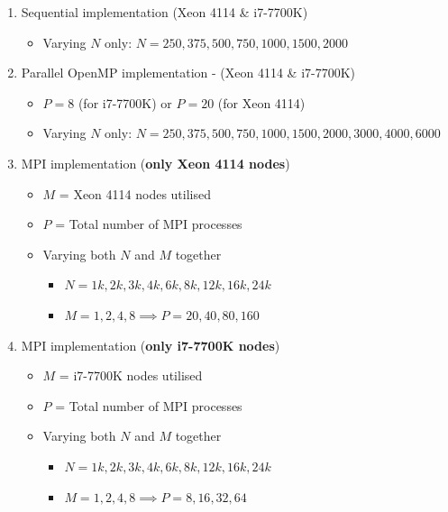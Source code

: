 \documentclass[12pt]{article}
\begin{document}
\begin{enumerate}
    \item Sequential implementation (Xeon 4114 \& i7-7700K)
	\begin{itemize}
		\item Varying $N$ only: $N = 250, 375, 500, 750, 1000, 1500, 2000$
	\end{itemize}
	
	\item Parallel OpenMP implementation - (Xeon 4114 \& i7-7700K)
	\begin{itemize}
	    \item $P = 8$ (for i7-7700K) or $P = 20$ (for Xeon 4114)
		\item Varying $N$ only: $N = 250, 375, 500, 750, 1000, 1500, 2000, 3000, 4000, 6000$
	\end{itemize}
	
	\item MPI implementation (\textbf{only Xeon 4114 nodes})
	\begin{itemize}
		\item $M$ = Xeon 4114 nodes utilised
		\item $P$ = Total number of MPI processes
		\item Varying both $N$ and $M$ together
		\begin{itemize}
			\item $N = 1k, 2k, 3k, 4k, 6k, 8k, 12k, 16k, 24k$
			\item $M = 1, 2, 4, 8 \implies P = 20, 40, 80, 160$
		\end{itemize}
	\end{itemize}
	
	\item MPI implementation (\textbf{only i7-7700K nodes})
	\begin{itemize}
		\item $M$ = i7-7700K nodes utilised
		\item $P$ = Total number of MPI processes
		\item Varying both $N$ and $M$ together
		\begin{itemize}
			\item $N = 1k, 2k, 3k, 4k, 6k, 8k, 12k, 16k, 24k$
			\item $M = 1, 2, 4, 8 \implies P = 8, 16, 32, 64$
		\end{itemize}
	\end{itemize}
\end{enumerate}

\pagebreak
\end{document}
